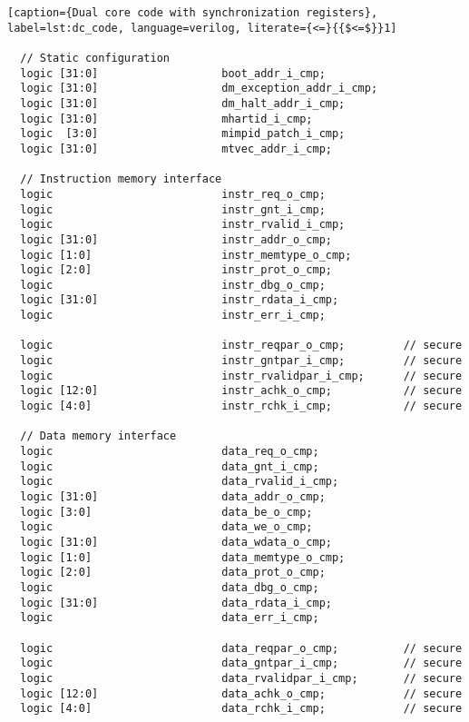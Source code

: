 \begin{lstlisting}[caption={Dual core code with synchronization registers}, label=lst:dc_code, language=verilog, literate={<=}{{$<=$}}1]                                                                                    

  // Static configuration
  logic [31:0]                   boot_addr_i_cmp;
  logic [31:0]                   dm_exception_addr_i_cmp;
  logic [31:0]                   dm_halt_addr_i_cmp;
  logic [31:0]                   mhartid_i_cmp;
  logic  [3:0]                   mimpid_patch_i_cmp;
  logic [31:0]                   mtvec_addr_i_cmp;

  // Instruction memory interface
  logic                          instr_req_o_cmp;
  logic                          instr_gnt_i_cmp;
  logic                          instr_rvalid_i_cmp;
  logic [31:0]                   instr_addr_o_cmp;
  logic [1:0]                    instr_memtype_o_cmp;
  logic [2:0]                    instr_prot_o_cmp;
  logic                          instr_dbg_o_cmp;
  logic [31:0]                   instr_rdata_i_cmp;
  logic                          instr_err_i_cmp;

  logic                          instr_reqpar_o_cmp;         // secure
  logic                          instr_gntpar_i_cmp;         // secure
  logic                          instr_rvalidpar_i_cmp;      // secure
  logic [12:0]                   instr_achk_o_cmp;           // secure
  logic [4:0]                    instr_rchk_i_cmp;           // secure

  // Data memory interface
  logic                          data_req_o_cmp;
  logic                          data_gnt_i_cmp;
  logic                          data_rvalid_i_cmp;
  logic [31:0]                   data_addr_o_cmp;
  logic [3:0]                    data_be_o_cmp;
  logic                          data_we_o_cmp;
  logic [31:0]                   data_wdata_o_cmp;
  logic [1:0]                    data_memtype_o_cmp;
  logic [2:0]                    data_prot_o_cmp;
  logic                          data_dbg_o_cmp;
  logic [31:0]                   data_rdata_i_cmp;
  logic                          data_err_i_cmp;

  logic                          data_reqpar_o_cmp;          // secure
  logic                          data_gntpar_i_cmp;          // secure
  logic                          data_rvalidpar_i_cmp;       // secure
  logic [12:0]                   data_achk_o_cmp;            // secure
  logic [4:0]                    data_rchk_i_cmp;            // secure


\end{lstlisting}
